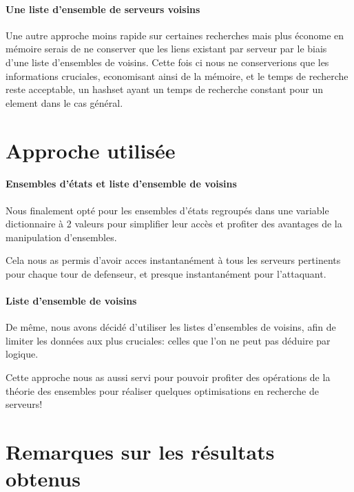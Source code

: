 \documentclass{scrreprt}
\begin{document}
    \paragraph{Une liste d'ensemble de serveurs voisins}
    Une autre approche moins rapide sur certaines recherches mais plus économe
    en mémoire serais de ne conserver que les liens existant par serveur par
    le biais d'une liste d'ensembles de voisins.
    Cette fois ci nous ne conserverions que les informations cruciales,
    economisant ainsi de la mémoire, et le temps de recherche reste
    acceptable, un hashset ayant un temps de recherche constant pour un
    element dans le cas général.


    \section{Approche utilisée}


    \paragraph{Ensembles d'états et liste d'ensemble de voisins}
    Nous finalement opté pour les ensembles d'états regroupés dans une
    variable dictionnaire à 2 valeurs pour simplifier leur accès et profiter
    des avantages de la manipulation d'ensembles.

    \begin{result}
        Cela nous as permis d'avoir acces instantanément à tous les serveurs
        pertinents pour chaque tour de defenseur, et presque instantanément pour
        l'attaquant.
    \end{result}

    \paragraph{Liste d'ensemble de voisins}
    De même, nous avons décidé d'utiliser les listes d'ensembles de voisins,
    afin de limiter les données aux plus cruciales: celles que l'on ne peut
    pas déduire par logique.

    \begin{result}
        Cette approche nous as aussi servi pour pouvoir profiter des opérations de
        la théorie des ensembles pour réaliser quelques optimisations en recherche
        de serveurs!
    \end{result}

    \section{Remarques sur les résultats obtenus}
\end{document}
